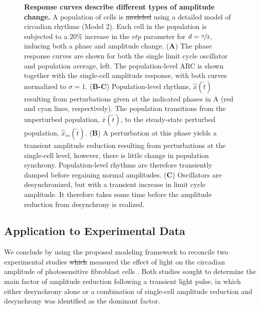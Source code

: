 \documentclass[11pt, letterpaper]{article}
\providecommand{\DIFadd}[1]{{\protect\color{blue}\uwave{#1}}} %
\providecommand{\DIFdel}[1]{{\protect\color{red}\sout{#1}}}                      %
\providecommand{\DIFaddbegin}{} %
\providecommand{\DIFaddend}{} %
\providecommand{\DIFdelbegin}{} %
\providecommand{\DIFdelend}{} %
\providecommand{\DIFaddFL}[1]{\DIFadd{#1}} %
\providecommand{\DIFdelFL}[1]{\DIFdel{#1}} %
\providecommand{\DIFaddbeginFL}{} %
\providecommand{\DIFaddendFL}{} %
\providecommand{\DIFdelbeginFL}{} %
\providecommand{\DIFdelendFL}{} %
\begin{document}
\begin{figure}[tbp]
  \begin{center}
    \caption{{\bfseries Response curves describe different types of amplitude
    change.} A population of cells is \DIFdelbeginFL \DIFdelFL{modeled }\DIFdelendFL \DIFaddbeginFL \DIFaddFL{simulated }\DIFaddendFL using a detailed model of
    circadian rhythms (Model 2). Each cell in the population is subjected to a
    $20\%$ increase in the $\mathit{vtp}$ parameter for $d=\nicefrac{\pi}{2}$,
    inducing both a phase and amplitude change. ({\bfseries A}) The phase
    response curves are shown for both the single limit cycle oscillator and
    population average, left. The population-level ARC is
    shown together with the single-cell amplitude response, with both curves
    normalized to $\sigma=1$. ({\bfseries B-C}) Population-level rhythms,
    $\hat{x}(\tilde{t})$ resulting from perturbations given at the indicated
    phases in A (red and cyan lines, respectively). The population transitions
    from the unperturbed population, $\bar{x}(\tilde{t})$, to the steady-state
    perturbed population, $\hat{x}_{ss}(\tilde{t})$. ({\bfseries B}) A
    perturbation at this phase yields a transient amplitude reduction resulting
    from perturbations at the single-cell level, however, there is little
    change in population synchrony.  Population-level rhythms are therefore
    transiently damped before regaining normal amplitudes. ({\bfseries C})
    Oscillators are desynchronized, but with a transient increase in limit
  cycle amplitude. It therefore takes some time before the amplitude reduction
from desynchrony is realized.}
  \end{center}
\end{figure}

\subsection*{Application to Experimental Data}

We conclude by using the proposed modeling framework to reconcile two
experimental studies \DIFdelbegin \DIFdel{which }\DIFdelend \DIFaddbegin \DIFadd{that }\DIFaddend measured the effect of light on the circadian
amplitude of photosensitive fibroblast cells \cite{Ukai2007, Pulivarthy2007}.
Both studies sought to determine the main factor of amplitude reduction
following a transient light pulse, in which either desynchrony alone
\cite{Ukai2007} or a combination of single-cell amplitude reduction and
desynchrony \cite{Pulivarthy2007} was identified as the dominant factor.
\end{document}
